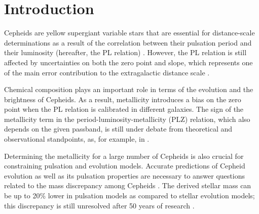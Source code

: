 \documentclass[article]{aa} %
\begin{document}
\maketitle

\section{Introduction}\label{Intro}
Cepheids are yellow supergiant variable stars that are essential for  distance-scale determinations as a result of the correlation
between their pulsation period and their luminosity (hereafter, the PL
relation) \citep{leavitt08,Leavitt1912}. However, the PL relation is still affected by uncertainties on both the zero point and slope, which represents one of the main error contribution to the extragalactic distance scale \citep{Riess2022}. 

Chemical composition plays an important role in terms of the evolution and the brightness of Cepheids. As a result, metallicity introduces a bias on the zero point when the PL relation is calibrated in different galaxies.
The sign of the metallicity term in the period-luminosity-metallicity (PLZ) relation, which also depends on the given passband, is still under debate from theoretical and observational standpoints, as, for example, in \cite{Caputo2000,Bono2008,Fiorentino2013,Gieren2018,Ripepi2021,Breuval2021,Wielgorski2022,Breuval2022,DeSomma2022}.


Determining the metallicity for a large number of Cepheids is also crucial for constraining pulsation and evolution models.  Accurate predictions of Cepheid evolution as well as its pulsation properties are necessary to answer questions related to the mass discrepancy among Cepheids \citep[see, e.g.,][]{neilson11}. The derived stellar mass
can be up to 20\% lower in pulsation models as compared to stellar evolution models; this discrepancy is still unresolved after 50 years of research \citep[see, e.g.,][]{stobie69,bono06,keller08}.
\end{document}
